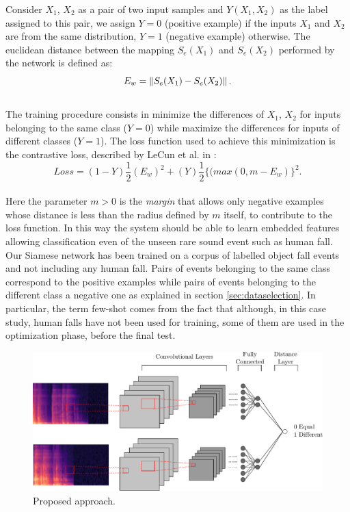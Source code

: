 Consider $X_1$, $X_2$ as a pair of two input samples and $Y(X_1, X_2)$ as the label assigned to this pair, we assign $Y = 0$ (positive example) if the inputs $X_1$ and $X_2$ are from the same distribution, $Y = 1$ (negative example) otherwise. The euclidean distance between the mapping $S_e(X_1)$ and $S_e(X_2)$ performed by the network is defined as:
\begin{equation}
E_w = \left\lVert S_e (X_1) - S_e (X_2)\right\rVert.
\end{equation}\\
The training procedure consists in minimize the differences of $X_1$, $X_2$ for inputs belonging to the same class ($Y = 0$) while maximize the differences for inputs of different classes ($Y = 1$). %
The loss function used to achieve this minimization is the contrastive loss, described by LeCun et al. in \cite{chopra2005learning}:
\begin{equation}
Loss = (1 - Y)\frac{1}{2}(E_w)^2 + (Y)\frac{1}{2}\{(max(0, m - E_w)\}^2 .
\end{equation}\\
Here the parameter $m > 0$ is the \textit{margin} that allows only negative examples whose distance is less than the radius defined by $m$ itself, to contribute to the loss function.
In this way the system should be able to learn embedded features allowing classification even of the unseen rare sound event such as human fall.
Our Siamese network has been trained on a corpus of labelled object fall events and not including any human fall. Pairs of events belonging to the same class correspond to the positive examples while pairs of events belonging to the different class a negative one as explained in section \ref{sec:dataselection}. In particular, the term few-shot comes from the fact that although, in this case study, human falls have not been used for training, some of them are used in the optimization phase, before the final test.
\begin{figure}
	\includegraphics[width=\linewidth]{img/prai/Siamese_approach}
	\caption{Proposed approach.}
	\label{proposed_approach}
	
\end{figure}
